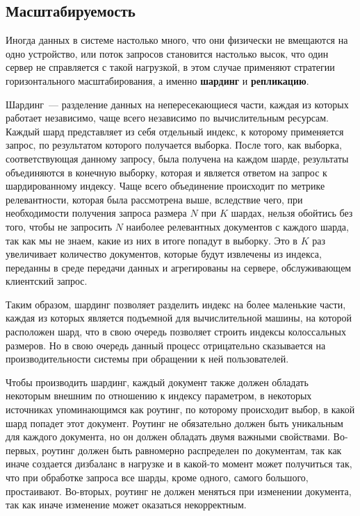 \subsection{Масштабируемость}

Иногда данных в системе настолько много, что они физически не вмещаются на одно устройство, или поток запросов становится настолько высок, что один сервер не справляется с такой нагрузкой, в этом случае применяют стратегии горизонтального масштабирования, а именно \textbf{шардинг} и \textbf{репликацию}.

Шардинг~--- разделение данных на непересекающиеся части, каждая из которых работает независимо, чаще всего независимо по вычислительным ресурсам. Каждый шард представляет из себя отдельный индекс, к которому применяется запрос, по результатом которого получается выборка. После того, как выборка, соответствующая данному запросу, была получена на каждом шарде, результаты объединяются в конечную выборку, которая и является ответом на запрос к шардированному индексу. Чаще всего объединение происходит по метрике релевантности, которая была рассмотрена выше, вследствие чего, при необходимости получения запроса размера $N$ при $K$ шардах, нельзя обойтись без того, чтобы не запросить $N$ наиболее релевантных документов с каждого шарда, так как мы не знаем, какие из них в итоге попадут в выборку. Это в $K$ раз увеличивает количество документов, которые будут извлечены из индекса, переданны в среде передачи данных и агрегированы на сервере, обслуживающем клиентский запрос.

Таким образом, шардинг позволяет разделить индекс на более маленькие части, каждая из которых является подъемной для вычислительной машины, на которой расположен шард, что в свою очередь позволяет строить индексы колоссальных размеров. Но в свою очередь данный процесс отрицательно сказывается на производительности системы при обращении к ней пользователей.

Чтобы производить шардинг, каждый документ также должен обладать некоторым внешним по отношению к индексу параметром, в некоторых источниках упоминающимся как роутинг, по которому происходит выбор, в какой шард попадет этот документ. Роутинг не обязательно должен быть уникальным для каждого документа, но он должен обладать двумя важными свойствами. Во-первых, роутинг должен быть равномерно распределен по документам, так как иначе создается дизбаланс в нагрузке и в какой-то момент может получиться так, что при обработке запроса все шарды, кроме одного, самого большого, простаивают. Во-вторых, роутинг не должен меняться при изменении документа, так как иначе изменение может оказаться некорректным.


